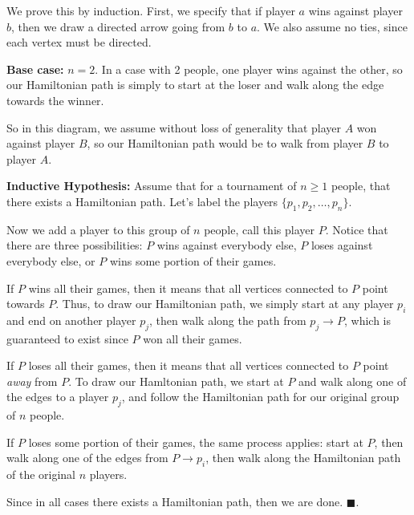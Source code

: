 \documentclass[11pt]{article}
\begin{document}
\begin{solution}
    We prove this by induction. First, we specify that if player $a$ wins against player $b$, then we draw a directed arrow going from $b$ to $a$. We also assume no ties, since each vertex must be directed.

    \textbf{Base case:} $n = 2$. In a case with 2 people, one player wins against the other, so our Hamiltonian path is simply to start at the loser and walk along the edge towards the winner. 

    \begin{center}
    \end{center}

    So in this diagram, we assume without loss of generality that player $A$ won against player $B$, so our Hamiltonian path would be to walk from player $B$ to player $A$.

    \textbf{Inductive Hypothesis:} Assume that for a tournament of $n \geq 1$ people, that there exists a Hamiltonian path. Let's label the players $\{p_1, p_2, \dots, p_n\}$.

    Now we add a player to this group of $n$ people, call this player $P$. Notice that there are three possibilities: $P$ wins against everybody else, $P$ loses against everybody else, or $P$ wins some portion of their games. 

    If $P$ wins all their games, then it means that all vertices connected to $P$ point towards $P$. Thus, to draw our Hamiltonian path, we simply start at any player $p_i$ and end on another player $p_j$, then walk along the path from $p_j \to P$, which is guaranteed to exist since $P$ won all their games.

    If $P$ loses all their games, then it means that all vertices connected to $P$ point \textit{away} from $P$. To draw our Hamltonian path, we start at $P$ and walk along one of the edges to a player $p_j$, and follow the Hamiltonian path for our original group of $n$ people. 

    If $P$ loses some portion of their games, the same process applies: start at $P$, then walk along one of the edges from $P \to p_i$, then walk along the  Hamiltonian path of the original $n$ players. 

    Since in all cases there exists a Hamiltonian path, then we are done. $\blacksquare$.
\end{solution}
\pagebreak
{} 
\end{document}
